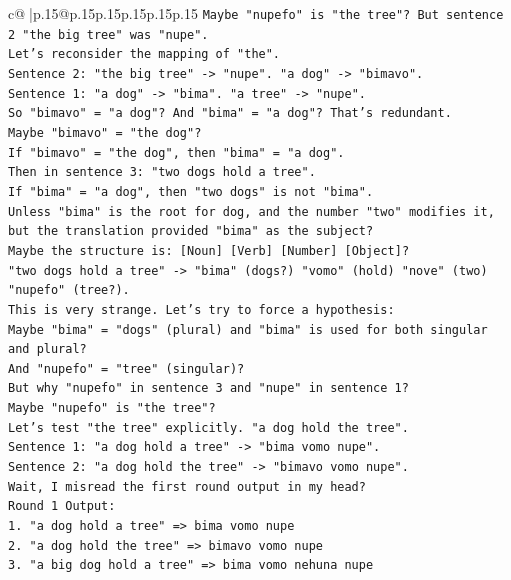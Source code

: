 \documentclass{article}
\begin{document}
{\begin{supertabular}{c@{$\;$}|p{.15\linewidth}@{}p{.15\linewidth}p{.15\linewidth}p{.15\linewidth}p{.15\linewidth}p{.15\linewidth}}
{{{\texttt{Maybe "nupefo" is "the tree"? But sentence 2 "the big tree" was "nupe".} \\
\texttt{Let's reconsider the mapping of "the".} \\
\texttt{Sentence 2: "the big tree" {-}> "nupe". "a dog" {-}> "bimavo".} \\
\texttt{Sentence 1: "a dog" {-}> "bima". "a tree" {-}> "nupe".} \\
\texttt{So "bimavo" = "a dog"? And "bima" = "a dog"? That's redundant.} \\
\texttt{Maybe "bimavo" = "the dog"?} \\
\texttt{If "bimavo" = "the dog", then "bima" = "a dog".} \\
\texttt{Then in sentence 3: "two dogs hold a tree".} \\
\texttt{If "bima" = "a dog", then "two dogs" is not "bima".} \\
\texttt{Unless "bima" is the root for dog, and the number "two" modifies it, but the translation provided "bima" as the subject?} \\
\texttt{Maybe the structure is: {[}Noun{]} {[}Verb{]} {[}Number{]} {[}Object{]}?} \\
\texttt{"two dogs hold a tree" {-}> "bima" (dogs?) "vomo" (hold) "nove" (two) "nupefo" (tree?).} \\
\texttt{This is very strange. Let's try to force a hypothesis:} \\
\texttt{Maybe "bima" = "dogs" (plural) and "bima" is used for both singular and plural?} \\
\texttt{And "nupefo" = "tree" (singular)?} \\
\texttt{But why "nupefo" in sentence 3 and "nupe" in sentence 1?} \\
\texttt{Maybe "nupefo" is "the tree"?} \\
\texttt{Let's test "the tree" explicitly. "a dog hold the tree".} \\
\texttt{Sentence 1: "a dog hold a tree" {-}> "bima vomo nupe".} \\
\texttt{Sentence 2: "a dog hold the tree" {-}> "bimavo vomo nupe".} \\
\texttt{Wait, I misread the first round output in my head?} \\
\texttt{Round 1 Output:} \\
\texttt{1. "a dog hold a tree" => bima vomo nupe} \\
\texttt{2. "a dog hold the tree" => bimavo vomo nupe} \\
\texttt{3. "a big dog hold a tree" => bima vomo nehuna nupe} \\
}}}
\end{supertabular}}
\end{document}
